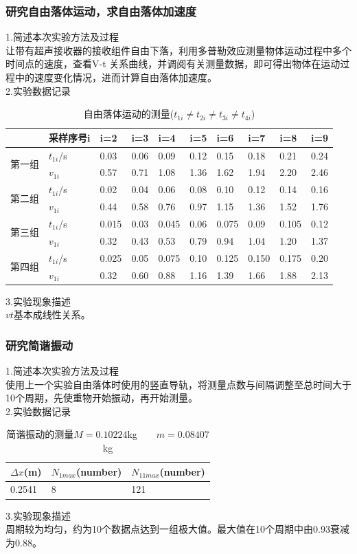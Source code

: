 \documentclass[dvipsnames, svgnames,a4paper,11pt]{article}
\begin{document}
\subsubsection{研究自由落体运动，求自由落体加速度}
\noindent1.简述本次实验方法及过程\\
让带有超声接收器的接收组件自由下落，利用多普勒效应测量物体运动过程中多个时间点的速度，查看V-t
关系曲线，并调阅有关测量数据，即可得出物体在运动过程中的速度变化情况，进而计算自由落体加速度。\\
\noindent2.实验数据记录
\begin{table}[H]
	\centering
	\caption{自由落体运动的测量($t_{1i}\neq t_{2i}\neq t_{3i}\neq t_{4i}$)}
	\begin{tabularx}{\textwidth}{|X|X|X|X|X|X|X|X|X|X|}
		\hline
		&采样序号i&i=2&i=3&i=4&i=5&i=6&i=7&i=8&i=9\\
		\hline
		\multirow{2}{*}{第一组}&$t_{1i}$/s&0.03&0.06&0.09&0.12&0.15&0.18&0.21&0.24\\
		\cline{2-10}
		&$v_{1i}$&0.57&0.71&1.08&1.36&1.62&1.94&2.20&2.46\\
		\hline
		\multirow{2}{*}{第二组}&$t_{1i}$/s&0.02&0.04&0.06&0.08&0.10&0.12&0.14&0.16\\
		\cline{2-10}
		&$v_{1i}$&0.44&0.58&0.76&0.97&1.15&1.36&1.52&1.76\\
		\hline
		\multirow{2}{*}{第三组}&$t_{1i}$/s&0.015&0.03&0.045&0.06&0.075&0.09&0.105&0.12\\
		\cline{2-10}
		&$v_{1i}$&0.32&0.43&0.53&0.79&0.94&1.04&1.20&1.37\\
		\hline
		\multirow{2}{*}{第四组}&$t_{1i}$/s&0.025&0.05&0.075&0.10&0.125&0.150&0.175&0.20\\
		\cline{2-10}
		&$v_{1i}$&0.32&0.60&0.88&1.16&1.39&1.66&1.88&2.13\\
		\hline
	\end{tabularx}
\end{table}
\noindent3.实验现象描述\\
$vt$基本成线性关系。

\subsubsection{研究简谐振动}
\noindent1.简述本次实验方法及过程\\
使用上一个实验自由落体时使用的竖直导轨，将测量点数与间隔调整至总时间大于10个周期，先使重物开始振动，再开始测量。\\
\noindent2.实验数据记录
\begin{table}[H]
	\centering
	\caption{简谐振动的测量\hfill$M=0.10224$kg\ \ \ \ $m=0.08407$kg}
	\begin{tabularx}{\textwidth}{|X|X|X|}
		\hline
		$\Delta x$(m)&$N_{1max}$(number)&$N_{11max}$(number)\\
		\hline
		0.2541&8&121\\
		\hline
	\end{tabularx}
\end{table}
\noindent3.实验现象描述\\
周期较为均匀，约为10个数据点达到一组极大值。最大值在10个周期中由0.93衰减为0.88。
\end{document}
